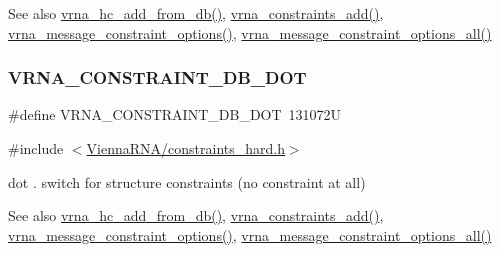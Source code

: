 \begin{DoxySeeAlso}{See also}
\hyperlink{group__hard__constraints_ga5b4de3247b67358080c176b94591a8e6}{vrna\+\_\+hc\+\_\+add\+\_\+from\+\_\+db()}, \hyperlink{group__constraints_ga35a401f680969a556858a8dd5f1d07cc}{vrna\+\_\+constraints\+\_\+add()}, \hyperlink{group__constraints_gaa1f20b53bf09ac2e6b0dbb13f7d89670}{vrna\+\_\+message\+\_\+constraint\+\_\+options()}, \hyperlink{group__constraints_gaec7e13fa0465c2acc7a621d1aecb709f}{vrna\+\_\+message\+\_\+constraint\+\_\+options\+\_\+all()} 
\end{DoxySeeAlso}
\mbox{\label{group__hard__constraints_ga369bea82eae75fbe626f409fa425747e}} 
\subsubsection{\texorpdfstring{V\+R\+N\+A\+\_\+\+C\+O\+N\+S\+T\+R\+A\+I\+N\+T\+\_\+\+D\+B\+\_\+\+D\+OT}{VRNA\_CONSTRAINT\_DB\_DOT}}
{\footnotesize\ttfamily \#define V\+R\+N\+A\+\_\+\+C\+O\+N\+S\+T\+R\+A\+I\+N\+T\+\_\+\+D\+B\+\_\+\+D\+OT~131072U}



{\ttfamily \#include $<$\hyperlink{constraints__hard_8h}{Vienna\+R\+N\+A/constraints\+\_\+hard.\+h}$>$}



dot \textquotesingle{}.\textquotesingle{} switch for structure constraints (no constraint at all) 

\begin{DoxySeeAlso}{See also}
\hyperlink{group__hard__constraints_ga5b4de3247b67358080c176b94591a8e6}{vrna\+\_\+hc\+\_\+add\+\_\+from\+\_\+db()}, \hyperlink{group__constraints_ga35a401f680969a556858a8dd5f1d07cc}{vrna\+\_\+constraints\+\_\+add()}, \hyperlink{group__constraints_gaa1f20b53bf09ac2e6b0dbb13f7d89670}{vrna\+\_\+message\+\_\+constraint\+\_\+options()}, \hyperlink{group__constraints_gaec7e13fa0465c2acc7a621d1aecb709f}{vrna\+\_\+message\+\_\+constraint\+\_\+options\+\_\+all()} 
\end{DoxySeeAlso}
\mbox{\label{group__hard__constraints_ga7283bbe0f8954f7b030ecc3f2d1932b2}} 
